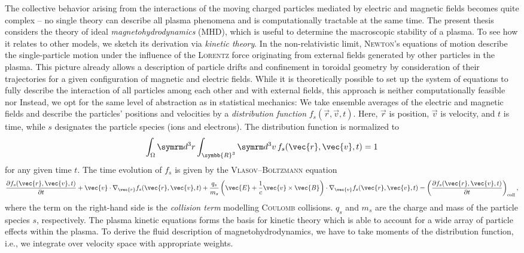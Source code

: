 The collective behavior arising from the interactions of the moving charged particles mediated by electric and magnetic fields becomes quite complex -- no single theory can describe all plasma phenomena and is computationally tractable at the same time. The present thesis considers the theory of ideal \emph{magnetohydrodynamics} (MHD), which is useful to determine the macroscopic stability of a plasma. To see how it relates to other models, we sketch its derivation via \emph{kinetic theory}. In the non-relativistic limit, \textsc{Newton}'s equations of motion describe the single-particle motion under the influence of the \textsc{Lorentz} force originating from external fields generated by other particles in the plasma. This picture already allows a description of particle drifts and confinement in toroidal geometry by consideration of their trajectories for a given configuration of magnetic and electric fields. While it is theoretically possible to set up the system of equations to fully describe the interaction of all particles among each other and with external fields, this approach is neither computationally feasible nor  Instead, we opt for the same level of abstraction as in statistical mechanics: We take ensemble averages of the electric and magnetic fields and describe the particles' positions and velocities by a \emph{distribution function} $f_{s} (\vec{r}, \vec{v}, t)$. Here, $\vec{r}$ is position, $\vec{v}$ is velocity, and $t$ is time, while $s$ designates the particle species (ions and electrons). The distribution function is normalized to
\begin{gather}
  \int_{\Omega} \diff^{3} r \int_{\symbb{R}^{3}} \diff^{3} v \, f_{s} (\vec{r}, \vec{v}, t) = 1
\end{gather}
for any given time $t$. The time evolution of $f_{s}$ is given by the \textsc{Vlasov}--\textsc{Boltzmann} equation
\begin{gather}
  \pd[f_{s} (\vec{r}, \vec{v}, t)]{t} + \vec{v} \cdot \grad_{\vec{r}} f_{s} (\vec{r}, \vec{v}, t) + \frac{q_{s}}{m_{s}} \left ( \vec{E} + \frac{1}{c} \vec{v} \times \vec{B} \right ) \cdot \grad_{\vec{v}} f_{s} (\vec{r}, \vec{v}, t) = \left ( \pd[f_{s} (\vec{r}, \vec{v}, t)]{t} \right )_{\text{coll}},
\end{gather}
where the term on the right-hand side is the \emph{collision term} modelling \textsc{Coulomb} collisions. $q_{s}$ and $m_{s}$ are the charge and mass of the particle species $s$, respectively. The plasma kinetic equations forms the basis for kinetic theory which is able to account for a wide array of particle effects within the plasma. To derive the fluid description of magnetohydrodynamics, we have to take moments of the distribution function, i.e., we integrate over velocity space with appropriate weights.

